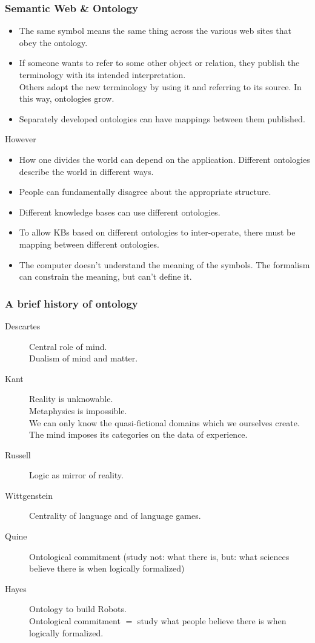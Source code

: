 \documentclass[UTF8,11pt,colorlinks,compress,openany]{beamer}%
\begin{document}
\begin{frame}\frametitle{Semantic Web \& Ontology}
\begin{itemize}
	\item The same symbol means the same thing across the various web sites that obey the ontology.
	\item If someone wants to refer to some other object or relation, they publish the terminology with its intended interpretation.\\
	Others adopt the new terminology by using it and referring to its source. In this way, ontologies grow.
	\item Separately developed ontologies can have mappings between them published.
\end{itemize}
However
\begin{itemize}
	\item How one divides the world can depend on the application. Different ontologies describe the world in different ways.
	\item People can fundamentally disagree about the appropriate structure.
	\item Different knowledge bases can use different ontologies.
	\item To allow KBs based on different ontologies to inter-operate, there must be mapping between different ontologies.
	\item The computer doesn't understand the meaning of the symbols. The formalism can constrain the meaning, but can't define it.
\end{itemize}
\end{frame}

\begin{frame}\frametitle{A brief history of ontology}
\begin{description}
	\item[Descartes] Central role of mind.\\
	Dualism of mind and matter.
	\item[Kant] Reality is unknowable.\\
	Metaphysics is impossible.\\
	We can only know the quasi-fictional domains which we ourselves create.\\
	The mind imposes its categories on the data of experience.
	\item[Russell] Logic as mirror of reality.
	\item[Wittgenstein] Centrality of language and of language games.
	\item[Quine] Ontological commitment (study not: what there is, but: what sciences believe there is when logically formalized)
	\item[Hayes] Ontology to build Robots.\\
	Ontological commitment $=$ study what people believe there is when logically formalized.
\end{description}
\end{frame}
\end{document}
